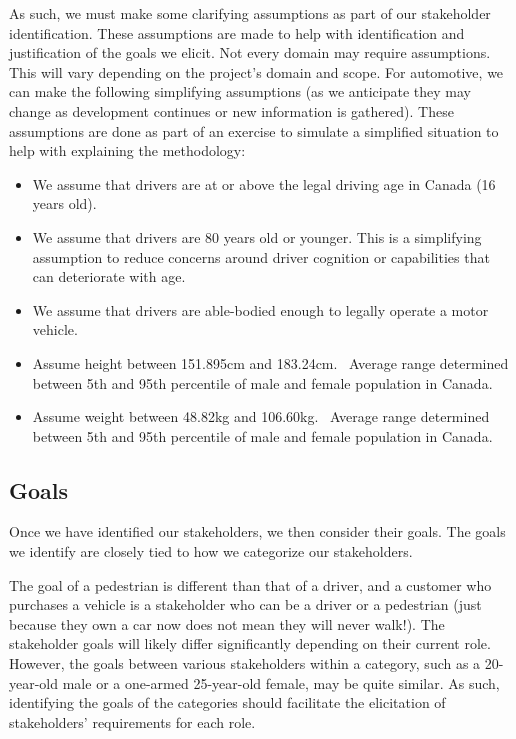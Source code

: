 As such, we must make some clarifying assumptions as part of our stakeholder identification. These assumptions are made to help with identification and justification of the goals we elicit. Not every domain may require assumptions. This will vary depending on the project's domain and scope. For automotive, we can make the following simplifying assumptions (as we anticipate they may change as development continues or new information is gathered). These assumptions are done as part of an exercise to simulate a simplified situation to help with explaining the methodology:
\begin{itemize}
	\item We assume that drivers are at or above the legal driving age in Canada (16 years old).
	\item We assume that drivers are 80 years old or younger. This is a simplifying assumption to reduce concerns around driver cognition or capabilities that can deteriorate with age.
	\item We assume that drivers are able-bodied enough to legally operate a motor vehicle.
	\item Assume height between 151.895cm and 183.24cm.~\cite{AgeHeightStats} Average range determined between 5th and 95th percentile of male and female population in Canada.
	\item Assume weight between 48.82kg and 106.60kg.~\cite{AgeWeightStats} Average range determined between 5th and 95th percentile of male and female population in Canada.
\end{itemize}

\subsection{Goals}

Once we have identified our stakeholders, we then consider their goals. The goals we identify are closely tied to how we categorize our stakeholders. 

The goal of a pedestrian is different than that of a driver, and a customer who purchases a vehicle is a stakeholder who can be a driver or a pedestrian (just because they own a car now does not mean they will never walk!). The stakeholder goals will likely differ significantly depending on their current role. However, the goals between various stakeholders within a category, such as a 20-year-old male or a one-armed 25-year-old female, may be quite similar. As such, identifying the goals of the categories should facilitate the elicitation of stakeholders' requirements for each role.

